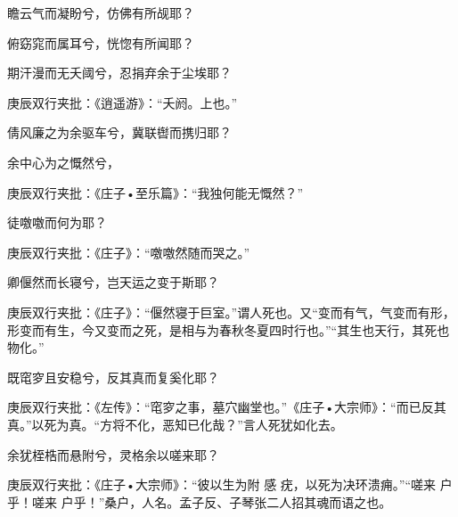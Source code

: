 \begin{qute2sp}
\begin{poem}
        \begin{pl}瞻云气而凝盼兮，仿佛有所觇耶？\end{pl}

        \begin{pl}俯窈窕而属耳兮，恍惚有所闻耶？\end{pl}

        \begin{pl}期汗漫而无夭阈兮，忍捐弃余于尘埃耶？\end{pl}
        \begin{note}庚辰双行夹批：《逍遥游》：“夭阏。上也。”\end{note}

        \begin{pl}倩风廉之为余驱车兮，冀联辔而携归耶？\end{pl}

        \begin{pl}余中心为之慨然兮，\end{pl}
        \begin{note}庚辰双行夹批：《庄子•至乐篇》：“我独何能无慨然？”\end{note}徒噭噭而何为耶？
        \begin{note}庚辰双行夹批：《庄子》：“噭噭然随而哭之。”\end{note}

        \begin{pl}卿偃然而长寝兮，岂天运之变于斯耶？\end{pl}
        \begin{note}庚辰双行夹批：《庄子》：“偃然寝于巨室。”谓人死也。又“变而有气，气变而有形，形变而有生，今又变而之死，是相与为春秋冬夏四时行也。”“其生也天行，其死也物化。”\end{note}

        \begin{pl}既窀穸且安稳兮，反其真而复奚化耶？\end{pl}
        \begin{note}庚辰双行夹批：《左传》：“窀穸之事，墓穴幽堂也。”《庄子•大宗师》：“而已反其真。”以死为真。“方将不化，恶知已化哉？”言人死犹如化去。\end{note}

        \begin{pl}余犹桎梏而悬附兮，灵格余以嗟来耶？\end{pl}
        \begin{note}庚辰双行夹批：《庄子•大宗师》：“彼以生为附 感 疣，以死为决环溃痈。”“嗟来 户乎！嗟来 户乎！”桑户，人名。孟子反、子琴张二人招其魂而语之也。\end{note}


\end{poem}
\end{qute2sp}

